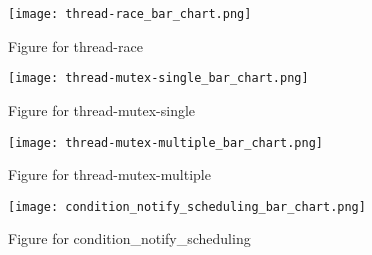 \documentclass{article}
\begin{document}
\begin{figure}[H]
\centering
\texttt{[image: thread-race\_bar\_chart.png]}
\caption{Figure for thread-race}
\end{figure}

\begin{figure}[H]
\centering
\texttt{[image: thread-mutex-single\_bar\_chart.png]}
\caption{Figure for thread-mutex-single}
\end{figure}

\begin{figure}[H]
\centering
\texttt{[image: thread-mutex-multiple\_bar\_chart.png]}
\caption{Figure for thread-mutex-multiple}
\end{figure}

\begin{figure}[H]
\centering
\texttt{[image: condition\_notify\_scheduling\_bar\_chart.png]}
\caption{Figure for condition_notify_scheduling}
\end{figure}
\end{document}
